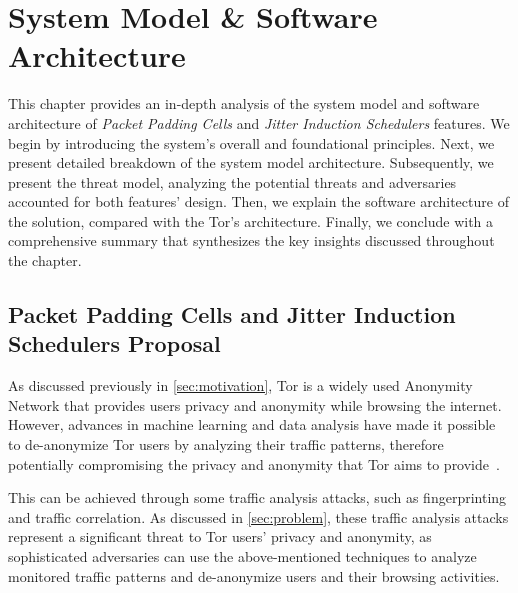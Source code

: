 
%

\makeatletter
\newcommand{\ntifpkgloaded}{%
  \@ifpackageloaded%
}
\makeatother


\chapter{System Model \& Software Architecture}\label{cha:system_model}

This chapter provides an in-depth analysis of the system model and software architecture of \textit{Packet Padding Cells} and \textit{Jitter Induction Schedulers} features. 
We begin by introducing the system's overall and foundational principles. 
Next, we present detailed breakdown of the system model architecture. 
Subsequently, we present the threat model, analyzing the potential threats and adversaries accounted for both features' design. 
Then, we explain the software architecture of the solution, compared with the Tor's architecture.
Finally, we conclude with a comprehensive summary that synthesizes the key insights discussed throughout the chapter.

\section{Packet Padding Cells and Jitter Induction Schedulers Proposal}\label{sec:system_propostal}

As discussed previously in \cref{sec:motivation}, Tor is a widely used Anonymity Network that provides users privacy and anonymity while browsing the internet. However, advances in machine learning and data analysis have made it possible to de-anonymize Tor users by analyzing their traffic patterns, therefore potentially  compromising the privacy and anonymity that Tor aims to provide~\cite{chakravarty2014trafficanalysis, johnson2013users,winter2012great,robjansen2019dosontor}. 

This can be achieved through some traffic analysis attacks, such as fingerprinting and traffic correlation. As discussed in \cref{sec:problem}, these traffic analysis attacks represent a significant threat to Tor users' privacy and anonymity, as sophisticated adversaries can use the above-mentioned techniques to analyze monitored traffic patterns and de-anonymize users and their browsing activities.


